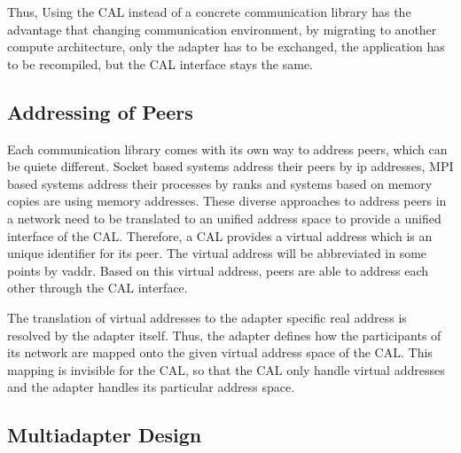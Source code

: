 Thus, Using the CAL instead of a concrete communication library has
the advantage that changing communication environment, by migrating to
another compute architecture, only the adapter has to be exchanged,
the application has to be recompiled, but the CAL interface stays the
same.


\subsection{Addressing of Peers}
Each communication library comes with its own way to address peers,
which can be quiete different. Socket based systems address their
peers by ip addresses, MPI based systems address their processes by
ranks and systems based on memory copies are using memory addresses.
These diverse approaches to address peers in a network need to be
translated to an unified address space to provide a unified interface of the CAL.
Therefore, a CAL provides a virtual address which is an unique
identifier for its peer. The virtual address
will be abbreviated in some points by vaddr. Based on this virtual
address, peers are able to address each other through the CAL
interface.

The translation of virtual addresses to the adapter specific real address
is resolved by the adapter itself. Thus, the adapter defines how the participants
of its network are mapped onto the given virtual address space of the CAL. This
mapping is invisible for the CAL, so that the CAL only handle virtual addresses
and the adapter handles its particular address space.


\subsection{Multiadapter Design}


